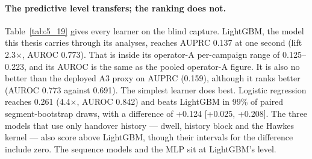 \paragraph{The predictive level transfers; the ranking does not.} Table~\ref{tab:5_19} gives every learner on the blind capture. LightGBM, the model this thesis carries through its analyses, reaches AUPRC 0.137 at one second (lift 2.3$\times$, AUROC 0.773). That is inside its operator-A per-campaign range of 0.125--0.223, and its AUROC is the same as the pooled operator-A figure. It is also no better than the deployed A3 proxy on AUPRC (0.159), although it ranks better (AUROC 0.773 against 0.691). The simplest learner does best. Logistic regression reaches 0.261 (4.4$\times$, AUROC 0.842) and beats LightGBM in 99\% of paired segment-bootstrap draws, with a difference of +0.124 [+0.025, +0.208]. The three models that use only handover history --- dwell, history block and the Hawkes kernel --- also score above LightGBM, though their intervals for the difference include zero. The sequence models and the MLP sit at LightGBM's level.

